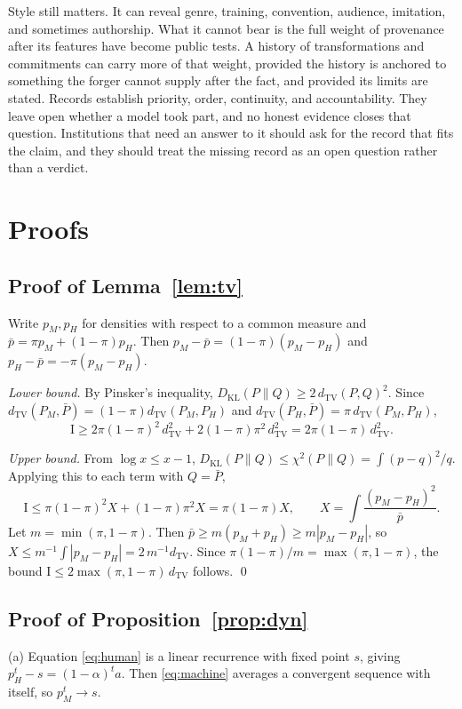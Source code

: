 \documentclass[11pt]{article}
\theoremstyle{plain}
\theoremstyle{definition}
\theoremstyle{remark}
\newcommand{\KL}{D_{\mathrm{KL}}}
\newcommand{\TV}{d_{\mathrm{TV}}}
\newcommand{\I}{\mathrm{I}}
\begin{document}
Style still matters. It can reveal genre, training, convention, audience, imitation, and sometimes authorship. What it cannot bear is the full weight of provenance after its features have become public tests. A history of transformations and commitments can carry more of that weight, provided the history is anchored to something the forger cannot supply after the fact, and provided its limits are stated. Records establish priority, order, continuity, and accountability. They leave open whether a model took part, and no honest evidence closes that question. Institutions that need an answer to it should ask for the record that fits the claim, and they should treat the missing record as an open question rather than a verdict.

\appendix

\section{Proofs}\label{app:proofs}

\subsection{Proof of Lemma~\ref{lem:tv}}

Write $p_M,p_H$ for densities with respect to a common measure and $\bar p=\pi p_M+(1-\pi)p_H$. Then $p_M-\bar p=(1-\pi)(p_M-p_H)$ and $p_H-\bar p=-\pi(p_M-p_H)$.

\emph{Lower bound.} By Pinsker's inequality, $\KL(P\|Q)\ge2\,\TV(P,Q)^2$. Since $\TV(P_M,\bar P)=(1-\pi)\TV(P_M,P_H)$ and $\TV(P_H,\bar P)=\pi\,\TV(P_M,P_H)$,
\[
\I\ge 2\pi(1-\pi)^2\,\TV^2+2(1-\pi)\pi^2\,\TV^2=2\pi(1-\pi)\,\TV^2.
\]

\emph{Upper bound.} From $\log x\le x-1$, $\KL(P\|Q)\le\chi^2(P\|Q)=\int (p-q)^2/q$. Applying this to each term with $Q=\bar P$,
\[
\I\le\pi(1-\pi)^2X+(1-\pi)\pi^2X=\pi(1-\pi)X,
\qquad
X=\int\frac{(p_M-p_H)^2}{\bar p}.
\]
Let $m=\min(\pi,1-\pi)$. Then $\bar p\ge m(p_M+p_H)\ge m|p_M-p_H|$, so $X\le m^{-1}\int|p_M-p_H|=2\,m^{-1}\TV$. Since $\pi(1-\pi)/m=\max(\pi,1-\pi)$, the bound $\I\le2\max(\pi,1-\pi)\,\TV$ follows. \qed

\subsection{Proof of Proposition~\ref{prop:dyn}}

(a) Equation \eqref{eq:human} is a linear recurrence with fixed point $s$, giving $p_H^t-s=(1-\alpha)^t a$. Then \eqref{eq:machine} averages a convergent sequence with itself, so $p_M^t\to s$.
\end{document}
